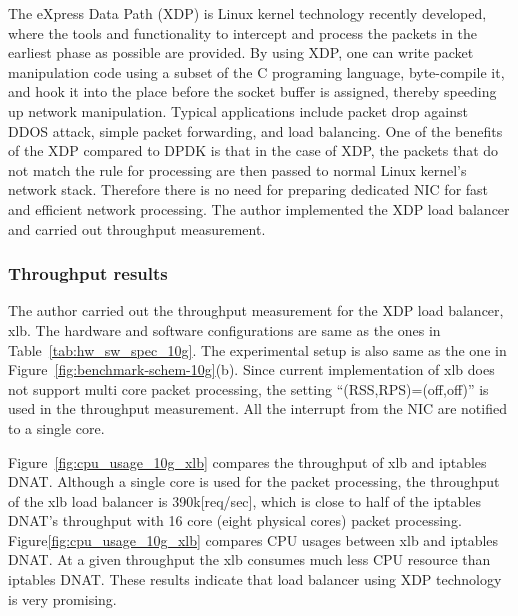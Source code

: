 The eXpress Data Path (XDP)\cite{hoiland2018express} is Linux kernel technology recently developed, where the tools and functionality to intercept and process the packets in the earliest phase as possible are provided.
By using XDP, one can write packet manipulation code using a subset of the C programing language, byte-compile it, and hook it into the place before the socket buffer is assigned, thereby speeding up network manipulation.
Typical applications include packet drop against DDOS attack, simple packet forwarding, and load balancing.
One of the benefits of the XDP compared to DPDK is that in the case of XDP, the packets that do not match the rule for processing are then passed to normal Linux kernel's network stack.
Therefore there is no need for preparing dedicated NIC for fast and efficient network processing.
The author implemented the XDP load balancer and carried out throughput measurement.



\subsubsection{Throughput results }

The author carried out the throughput measurement for the XDP load balancer, xlb.
The hardware and software configurations are same as the ones in Table~\ref{tab:hw_sw_spec_10g}.
The experimental setup is also same as the one in Figure~\ref{fig:benchmark-schem-10g}(b).
Since current implementation of xlb does not support multi core packet processing, the setting \enquote{(RSS,RPS)=(off,off)} is used in the throughput measurement.
All the interrupt from the NIC are notified to a single core.

Figure~\ref{fig:cpu_usage_10g_xlb} compares the throughput of xlb and iptables DNAT. 
Although a single core is used for the packet processing, the throughput of the xlb load balancer is 390k[req/sec], which is close to half of the iptables DNAT's throughput with 16 core (eight physical cores) packet processing.
Figure\ref{fig:cpu_usage_10g_xlb} compares CPU usages between xlb and iptables DNAT.
At a given throughput the xlb consumes much less CPU resource than iptables DNAT.
These results indicate that load balancer using XDP technology is very promising.

